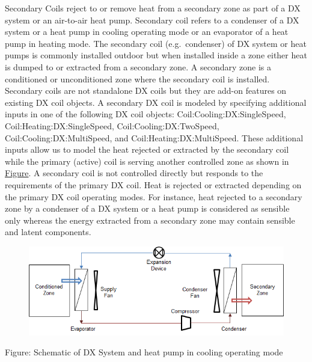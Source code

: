 Secondary Coils reject to or remove heat from a secondary zone as part of a DX system or an air-to-air heat pump. Secondary coil refers to a condenser of a DX system or a heat pump in cooling operating mode or an evaporator of a heat pump in heating mode. The secondary coil (e.g.~condenser) of DX system or heat pumps is commonly installed outdoor but when installed inside a zone either heat is dumped to or extracted from a secondary zone. A secondary zone is a conditioned or unconditioned zone where the secondary coil is installed. Secondary coils are not standalone DX coils but they are add-on features on existing DX coil objects. A secondary DX coil is modeled by specifying additional inputs in one of the following DX coil objects: Coil:Cooling:DX:SingleSpeed, Coil:Heating:DX:SingleSpeed, Coil:Cooling:DX:TwoSpeed, Coil:Cooling:DX:MultiSpeed, and Coil:Heating:DX:MultiSpeed. These additional inputs allow us to model the heat rejected or extracted by the secondary coil while the primary (active) coil is serving another controlled zone as shown in \protect\hyperlink{SecondaryCoilsFigure1}{Figure}. A secondary coil is not controlled directly but responds to the requirements of the primary DX coil. Heat is rejected or extracted depending on the primary DX coil operating modes. For instance, heat rejected to a secondary zone by a condenser of a DX system or a heat pump is considered as sensible only whereas the energy extracted from a secondary zone may contain sensible and latent components.

\begin{figure}[htbp]
\centering
\includegraphics{media/image903.png}
\caption{}
\end{figure}

Figure: Schematic of DX System and heat pump in cooling operating mode

